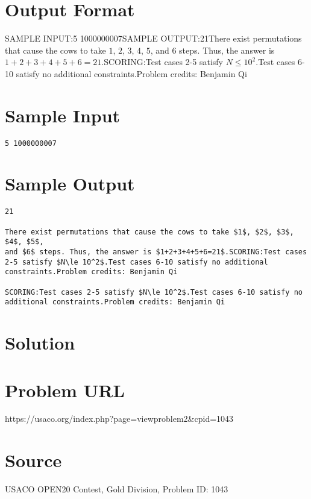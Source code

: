 \documentclass[12pt]{article}
\begin{document}
\section*{Output Format}
SAMPLE INPUT:5 1000000007SAMPLE OUTPUT:21There exist permutations that cause the cows to take $1$, $2$, $3$, $4$, $5$,
and $6$ steps. Thus, the answer is $1+2+3+4+5+6=21$.SCORING:Test cases 2-5 satisfy $N\le 10^2$.Test cases 6-10 satisfy no additional constraints.Problem credits: Benjamin Qi

\section*{Sample Input}
\begin{verbatim}
5 1000000007
\end{verbatim}

\section*{Sample Output}
\begin{verbatim}
21

There exist permutations that cause the cows to take $1$, $2$, $3$, $4$, $5$,
and $6$ steps. Thus, the answer is $1+2+3+4+5+6=21$.SCORING:Test cases 2-5 satisfy $N\le 10^2$.Test cases 6-10 satisfy no additional constraints.Problem credits: Benjamin Qi

SCORING:Test cases 2-5 satisfy $N\le 10^2$.Test cases 6-10 satisfy no additional constraints.Problem credits: Benjamin Qi
\end{verbatim}

\section*{Solution}


\section*{Problem URL}
https://usaco.org/index.php?page=viewproblem2&cpid=1043

\section*{Source}
USACO OPEN20 Contest, Gold Division, Problem ID: 1043
\end{document}
